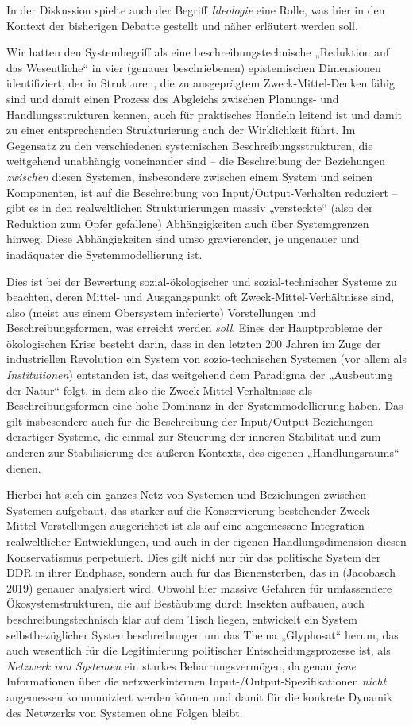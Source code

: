 \documentclass[11pt,a4paper]{article}
\begin{document}
In der Diskussion spielte auch der Begriff \emph{Ideologie} eine Rolle, was
hier in den Kontext der bisherigen Debatte gestellt und näher erläutert werden
soll.

Wir hatten den Systembegriff als eine beschreibungstechnische „Reduktion auf
das Wesentliche“ in vier (genauer beschriebenen) epistemischen Dimensionen
identifiziert, der in Strukturen, die zu ausgeprägtem Zweck-Mittel-Denken
fähig sind und damit einen Prozess des Abgleichs zwischen Planungs- und
Handlungsstrukturen kennen, auch für praktisches Handeln leitend ist und damit
zu einer entsprechenden Strukturierung auch der Wirklichkeit führt. Im
Gegensatz zu den verschiedenen systemischen Beschreibungsstrukturen, die
weitgehend unabhängig voneinander sind -- die Beschreibung der Beziehungen
\emph{zwischen} diesen Systemen, insbesondere zwischen einem System und seinen
Komponenten, ist auf die Beschreibung von Input/Output-Verhalten reduziert --
gibt es in den realweltlichen Strukturierungen massiv „versteckte“ (also der
Reduktion zum Opfer gefallene) Abhängigkeiten auch über Systemgrenzen hinweg.
Diese Abhängigkeiten sind umso gravierender, je ungenauer und inadäquater die
Systemmodellierung ist.

Dies ist bei der Bewertung sozial-ökologischer und sozial-technischer Systeme
zu beachten, deren Mittel- und Ausgangspunkt oft Zweck-Mittel-Verhältnisse
sind, also (meist aus einem Obersystem inferierte) Vorstellungen und
Beschreibungsformen, was erreicht werden \emph{soll}. Eines der Hauptprobleme
der ökologischen Krise besteht darin, dass in den letzten 200 Jahren im Zuge
der industriellen Revolution ein System von sozio-technischen Systemen (vor
allem als \emph{Institutionen}) entstanden ist, das weitgehend dem Paradigma
der „Ausbeutung der Natur“ folgt, in dem also die Zweck-Mittel-Verhältnisse
als Beschreibungsformen eine hohe Dominanz in der Systemmodellierung
haben. Das gilt insbesondere auch für die Beschreibung der
Input/Output-Beziehungen derartiger Systeme, die einmal zur Steuerung der
inneren Stabilität und zum anderen zur Stabilisierung des äußeren Kontexts,
des eigenen „Handlungsraums“ dienen.

Hierbei hat sich ein ganzes Netz von Systemen und Beziehungen zwischen
Systemen aufgebaut, das stärker auf die Konservierung bestehender
Zweck-Mittel-Vorstellungen ausgerichtet ist als auf eine angemessene
Integration realweltlicher Entwicklungen, und auch in der eigenen
Handlungsdimension diesen Konservatismus perpetuiert. Dies gilt nicht nur für
das politische System der DDR in ihrer Endphase, sondern auch für das
Bienensterben, das in (Jacobasch 2019) genauer analysiert wird.  Obwohl hier
massive Gefahren für umfassendere Ökosystemstrukturen, die auf Bestäubung
durch Insekten aufbauen, auch beschreibungstechnisch klar auf dem Tisch
liegen, entwickelt ein System selbstbezüglicher Systembeschreibungen um das
Thema „Glyphosat“ herum, das auch wesentlich für die Legitimierung politischer
Entscheidungsprozesse ist, als \emph{Netzwerk von Systemen} ein starkes
Beharrungsvermögen, da genau \emph{jene} Informationen über die
netzwerkinternen Input-/Output-Spezifikationen \emph{nicht} angemessen
kommuniziert werden können und damit für die konkrete Dynamik des Netwzerks
von Systemen ohne Folgen bleibt.
\end{document}
